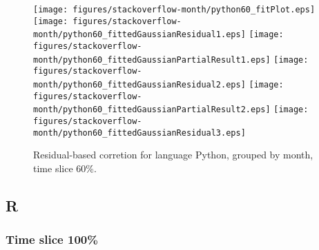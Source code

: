 \begin{figure}[t]
\centering
{}
{\texttt{[image: figures/stackoverflow-month/python60\_fitPlot.eps]}}
{\texttt{[image: figures/stackoverflow-month/python60\_fittedGaussianResidual1.eps]}}
{\texttt{[image: figures/stackoverflow-month/python60\_fittedGaussianPartialResult1.eps]}}
{\texttt{[image: figures/stackoverflow-month/python60\_fittedGaussianResidual2.eps]}}
{\texttt{[image: figures/stackoverflow-month/python60\_fittedGaussianPartialResult2.eps]}}
{\texttt{[image: figures/stackoverflow-month/python60\_fittedGaussianResidual3.eps]}}
\caption{Residual-based corretion for language Python, grouped by month, time slice 60\%.}
\end{figure}


\FloatBarrier


\subsection{R}

\subsubsection{Time slice 100\%}

